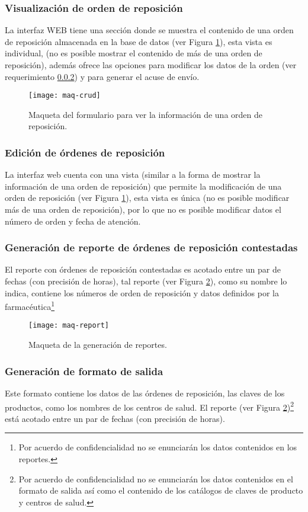 \subsubsection{Visualización de orden de reposición}\label{sec:req-show}
La interfaz WEB tiene una sección donde se muestra el contenido de una orden de reposición almacenada en la base de datos (ver Figura \ref{fig:maq-crud}), esta vista es individual, (no es posible mostrar el contenido de más de una orden de reposición), además ofrece las opciones para modificar los datos de la orden (ver requerimiento \ref{sec:req-update}) y para generar el acuse de envío.
\begin{figure}[h]
  \centering
  \texttt{[image: maq-crud]} 
  \caption{Maqueta del formulario para ver la información de una orden de reposición.}
  \label{fig:maq-crud}
\end{figure} 

\subsubsection{Edición de órdenes de reposición}\label{sec:req-update}
La interfaz web cuenta con una vista (similar a la forma de mostrar la información de una orden de reposición) que permite la modificación de una orden de reposición (ver Figura \ref{fig:maq-crud}), esta vista es única (no es posible modificar más de una orden de reposición), por lo que no es posible modificar datos el número de orden y fecha de atención.

\subsubsection{Generación de reporte de órdenes de reposición contestadas}\label{sec:req-rep-contestadas}
El reporte con órdenes de reposición contestadas es acotado entre un par de fechas (con precisión de horas), tal reporte (ver Figura \ref{fig:maq-report}), como su nombre lo indica, contiene los números de orden de reposición y datos definidos por la farmacéutica\footnote{Por acuerdo de confidencialidad no se enunciarán los datos contenidos en los reportes.}
\begin{figure}[h]
  \centering
  \texttt{[image: maq-report]} 
  \caption{Maqueta de la generación de reportes.}
  \label{fig:maq-report}
\end{figure} 

\subsubsection{Generación de formato de salida}\label{sec:req-rep-layout}
Este formato contiene los datos de las órdenes de reposición, las claves de los productos, como los nombres de los centros de salud. El reporte (ver Figura \ref{fig:maq-report})\footnote{Por acuerdo de confidencialidad no se enunciarán los datos contenidos en el formato de salida así como el contenido de los catálogos de claves de producto y centros de salud.} está acotado entre un par de fechas (con precisión de horas).

